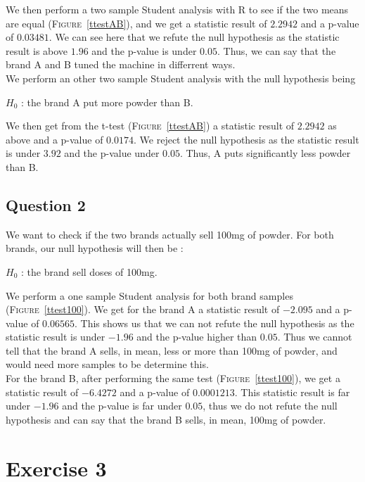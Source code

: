 \documentclass[12pt,a4paper]{article}
\begin{document}
We then perform a two sample Student analysis with R to see if the two means are equal (\textsc{Figure}~\ref{ttestAB}), and we get a statistic result of $2.2942$ and a p-value of $0.03481$. We can see here that we refute the null hypothesis as the statistic result is above $1.96$ and the p-value is under $0.05$. Thus, we can say that the brand A and B tuned the machine in differrent ways.\\

We perform an other two sample Student analysis with the null hypothesis being \begin{center}$H_0$ : the brand A put more powder than B.\end{center}
We then get from the t-test (\textsc{Figure}~\ref{ttestAB}) a statistic result of $2.2942$ as above and a p-value of $0.0174$. We reject the null hypothesis as the statistic result is under $3.92$ and the p-value under $0.05$. Thus, A puts significantly less powder than B.

\subsection*{Question 2}
We want to check if the two brands actually sell 100mg of powder. For both brands, our null hypothesis will then be :
\begin{center}$H_0$ : the brand sell doses of 100mg.\end{center}

We perform a one sample Student analysis for both brand samples (\textsc{Figure}~\ref{ttest100}). We get for the brand A a statistic result of $-2.095$ and a p-value of $0.06565$. This shows us that we can not refute the null hypothesis as the statistic result is under $-1.96$ and the p-value higher than $0.05$. Thus we cannot tell that the brand A sells, in mean, less or more than 100mg of powder, and would need more samples to be determine this.\\

For the brand B, after performing the same test (\textsc{Figure}~\ref{ttest100}), we get a statistic result of $-6.4272$ and a p-value of $0.0001213$. This statistic result is far under $-1.96$ and the p-value is far under $0.05$, thus we do not refute the null hypothesis and can say that the brand B sells, in mean, 100mg of powder.\\

\newpage
\section*{Exercise 3}
\end{document}
